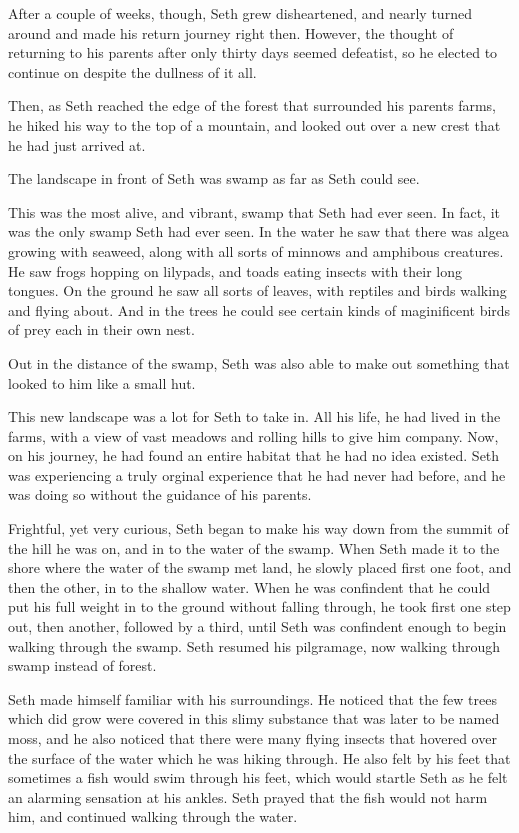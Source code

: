 \documentclass[12pt,twoside,titlepage]{report}
\begin{document}
After a couple of weeks, though, Seth grew disheartened, and nearly
turned around and made his return journey right then. However, the
thought of returning to his parents after only thirty days seemed
defeatist, so he elected to continue on despite the dullness of it all.

Then, as Seth reached the edge of the forest that surrounded his parents
farms, he hiked his way to the top of a mountain, and looked out over a
new crest that he had just arrived at.

The landscape in front of Seth was swamp as far as Seth could see.

This was the most alive, and vibrant, swamp that Seth had ever seen. In
fact, it was the only swamp Seth had ever seen. In the water he saw that
there was algea growing with seaweed, along with all sorts of minnows
and amphibous creatures. He saw frogs hopping on lilypads, and toads
eating insects with their long tongues. On the ground he saw all sorts
of leaves, with reptiles and birds walking and flying about. And in the
trees he could see certain kinds of maginificent birds of prey each in
their own nest.

Out in the distance of the swamp, Seth was also able to make out
something that looked to him like a small hut.

This new landscape was a lot for Seth to take in. All his life, he had
lived in the farms, with a view of vast meadows and rolling hills to
give him company. Now, on his journey, he had found an entire habitat
that he had no idea existed. Seth was experiencing a truly orginal
experience that he had never had before, and he was doing so without the
guidance of his parents.

Frightful, yet very curious, Seth began to make his way down from the
summit of the hill he was on, and in to the water of the swamp. When
Seth made it to the shore where the water of the swamp met land, he
slowly placed first one foot, and then the other, in to the shallow
water. When he was confindent that he could put his full weight in to
the ground without falling through, he took first one step out, then
another, followed by a third, until Seth was confindent enough to begin
walking through the swamp. Seth resumed his pilgramage, now walking
through swamp instead of forest.

Seth made himself familiar with his surroundings. He noticed that the
few trees which did grow were covered in this slimy substance that was
later to be named moss, and he also noticed that there were many flying
insects that hovered over the surface of the water which he was hiking
through. He also felt by his feet that sometimes a fish would swim
through his feet, which would startle Seth as he felt an alarming
sensation at his ankles. Seth prayed that the fish would not harm him,
and continued walking through the water.
\end{document}
